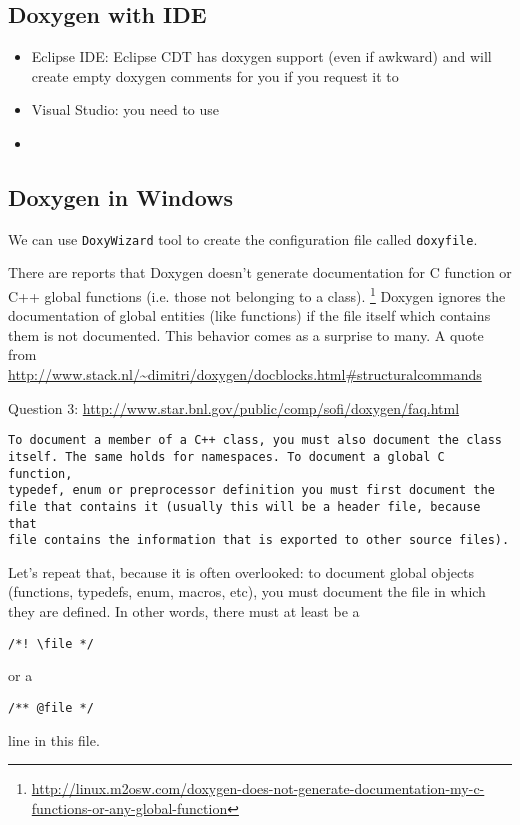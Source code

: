 \subsection{Doxygen with IDE}

\begin{itemize}
  \item Eclipse IDE: Eclipse CDT has doxygen support (even if awkward) and will
  create empty doxygen comments for you if you request it to
  
  \item Visual Studio: you need to use 

  \item 
\end{itemize}
\subsection{Doxygen in Windows}

We can use \verb!DoxyWizard! tool to create the configuration
file called \verb!doxyfile!. 

There are reports that Doxygen doesn't generate documentation for C function or
C++ global functions (i.e. those not belonging to a class).
\footnote{\url{http://linux.m2osw.com/doxygen-does-not-generate-documentation-my-c-functions-or-any-global-function}}
Doxygen ignores the documentation of global entities (like functions) if 
the file itself which contains them is not documented. This behavior 
comes as a surprise to many. A quote from 
\url{http://www.stack.nl/~dimitri/doxygen/docblocks.html\#structuralcommands}

Question 3: \url{http://www.star.bnl.gov/public/comp/sofi/doxygen/faq.html}
\begin{verbatim}
To document a member of a C++ class, you must also document the class 
itself. The same holds for namespaces. To document a global C function, 
typedef, enum or preprocessor definition you must first document the 
file that contains it (usually this will be a header file, because that 
file contains the information that is exported to other source files). 
\end{verbatim} 

Let's repeat that, because it is often overlooked: to document global 
objects (functions, typedefs, enum, macros, etc), you must document the 
file in which they are defined. In other words, there must at least be a 

\begin{verbatim}
/*! \file */
\end{verbatim} 

or a 

\begin{verbatim}
/** @file */ 
\end{verbatim}

line in this file. 



